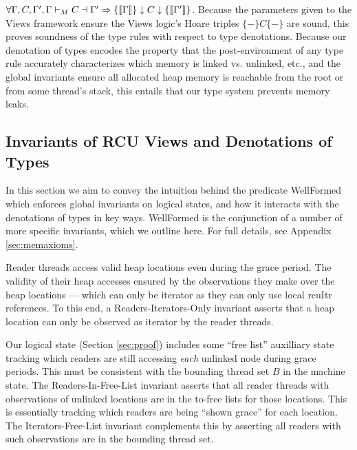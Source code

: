 $
    \forall \Gamma,C,\Gamma', \Gamma\vdash_M C \dashv \Gamma' \Rightarrow \{\llbracket\Gamma\rrbracket\}\downarrow C\downarrow\{\llbracket\Gamma'\rrbracket\}
$.
Because the parameters given to the Views framework ensure the Views logic's Hoare triples $\{-\}C\{-\}$ are sound, this proves soundness of the type rules with respect to type denotations.
Because our denotation of types encodes the property that the post-environment of any type rule accurately characterizes which memory is linked vs. unlinked, etc., and the global invariants ensure all allocated heap memory is reachable from the root or from some thread's stack, this entails that our type system prevents memory leaks.

\subsection{Invariants of RCU Views and Denotations of Types}
\label{sec:lemmas}
In this section we aim to convey the intuition behind the predicate \textsf{WellFormed} which enforces global invariants on logical states, and how it interacts with the denotations of types in key ways.
\textsf{WellFormed} is the conjunction of a number of more specific invariants, which we outline here.
For full details, see Appendix \ref{sec:memaxioms}.

 Reader threads access valid heap locations even during the grace period. The validity of their heap accesses ensured by the observations they make over the heap locations --- which can only be \textsf{iterator} as they can only use local \textsf{rcuItr} references. To this end, a \textsf{Readers-Iterators-Only} invariant asserts that a heap location can only be observed as \textsf{iterator} by the reader threads.

Our logical state (Section \ref{sec:proof}) includes some ``free list'' auxilliary state tracking which readers are still accessing \emph{each} unlinked node during grace periods. This must be consistent with the bounding thread set $B$ in the machine state.
The \textsf{Readers-In-Free-List} invariant 
asserts that all reader threads with observations of unlinked locations are in the to-free lists for those locations.
This is essentially tracking which readers are being ``shown grace'' for each location.
The \textsf{Iterators-Free-List} invariant complements this by asserting all readers with such observations are in the bounding thread set.


